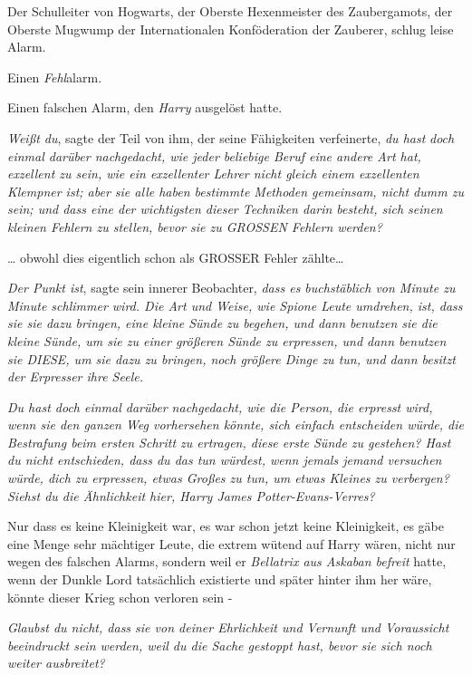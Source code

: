 {Der Schulleiter von Hogwarts, der Oberste Hexenmeister des Zaubergamots, der Oberste Mugwump der Internationalen Konföderation der Zauberer, schlug leise Alarm.

Einen \emph{Fehl}alarm.

Einen falschen Alarm, den \emph{Harry} ausgelöst hatte.

\emph{Weißt du}, sagte der Teil von ihm, der seine Fähigkeiten verfeinerte, \emph{du hast} \emph{doch} \emph{einmal darüber nachgedacht, wie jeder beliebige Beruf eine andere Art hat, exzellent zu sein, wie ein exzellenter Lehrer nicht gleich einem exzellenten Klempner ist; aber sie alle haben bestimmte Methoden gemeinsam, nicht dumm zu sein; und dass eine der wichtigsten dieser Techniken darin besteht, sich seinen kleinen Fehlern zu stellen, bevor sie zu GROSSEN Fehlern werden?}

… obwohl dies eigentlich schon als GROSSER Fehler zählte…

\emph{Der Punkt ist}, sagte sein innerer Beobachter, \emph{dass es buchstäblich von Minute zu Minute schlimmer wird. Die Art und Weise, wie Spione Leute umdrehen, ist, dass sie sie dazu bringen, eine kleine Sünde zu begehen, und dann benutzen sie die kleine Sünde, um sie zu einer größeren Sünde zu erpressen, und dann benutzen sie DIESE, um sie dazu zu bringen, noch größere Dinge zu tun, und dann besitzt der Erpresser ihre Seele.}

\emph{\emph{Du hast doch einmal darüber nachgedacht, wie die Person, die erpresst wird, wenn sie den ganzen Weg vorhersehen könnte, sich einfach entscheiden würde, die Bestrafung beim ersten Schritt zu ertragen, diese erste Sünde zu gestehen? Hast du nicht entschieden, dass du das tun würdest, wenn jemals jemand versuchen würde, dich zu erpressen, etwas Großes zu tun, um etwas Kleines zu verbergen? Siehst du die Ähnlichkeit hier, Harry James Potter-Evans-Verres?}}

Nur dass es keine Kleinigkeit war, es war schon jetzt keine Kleinigkeit, es gäbe eine Menge sehr mächtiger Leute, die extrem wütend auf Harry wären, nicht nur wegen des falschen Alarms, sondern weil er \emph{Bellatrix aus Askaban befreit} hatte, wenn der Dunkle Lord tatsächlich existierte und später hinter ihm her wäre, könnte dieser Krieg schon verloren sein -

\emph{\emph{Glaubst du nicht, dass sie von deiner Ehrlichkeit und Vernunft und Voraussicht beeindruckt sein werden, weil du die Sache gestoppt hast, bevor sie sich noch weiter ausbreitet?}}

}
